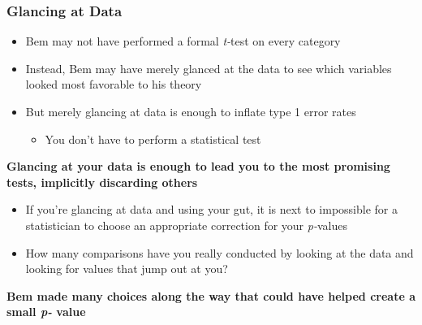 \documentclass[10pt, block=fill]{beamer}
\begin{document}
\begin{frame}
    \frametitle{Glancing at Data}
    
    \begin{itemize}
        \item Bem may not have performed a formal \textit{t-}test on every category
        \item Instead, Bem may have merely glanced at the data to see which variables looked most favorable to his theory
        \item But merely glancing at data is enough to inflate type 1 error rates
        \begin{itemize}
            \item You don't have to perform a statistical test
        \end{itemize}
    \end{itemize}
    
    \textbf{Glancing at your data is enough to lead you to the most promising tests, implicitly discarding others}
    \begin{itemize}
        \item If you're glancing at data and using your gut, it is next to impossible for a statistician to choose an appropriate correction for your \textit{p-}values
        \item How many comparisons have you really conducted by looking at the data and looking for values that jump out at you?
    \end{itemize}
    
    \textbf{ {\large Bem made many choices along the way that could have helped create a small \textit{p-} value}}
\end{frame}
\end{document}
